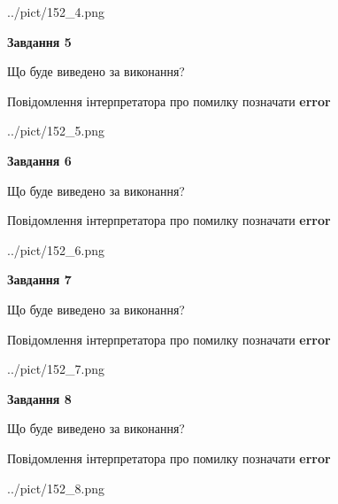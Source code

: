 \documentclass[12pt, ukrainian]{article}
\begin{document}
{\begin{center}
	{../pict/152_4.png}
\end{center}
\newpage

{\begin {center}\textbf{Завдання 5}\end {center}}\par
Що буде виведено за виконання? \par
Повідомлення інтерпретатора про помилку позначати \textbf{error}

\begin{center}
	{../pict/152_5.png}
\end{center}
\newpage

{\begin {center}\textbf{Завдання 6}\end {center}}\par
Що буде виведено за виконання? \par
Повідомлення інтерпретатора про помилку позначати \textbf{error}

\begin{center}
	{../pict/152_6.png}
\end{center}
\newpage

{\begin {center}\textbf{Завдання 7}\end {center}}\par
Що буде виведено за виконання? \par
Повідомлення інтерпретатора про помилку позначати \textbf{error}

\begin{center}
	{../pict/152_7.png}
\end{center}
\newpage

{\begin {center}\textbf{Завдання 8}\end {center}}\par
Що буде виведено за виконання? \par
Повідомлення інтерпретатора про помилку позначати \textbf{error}

\begin{center}
	{../pict/152_8.png}
\end{center}
\newpage

}
\end{document}
